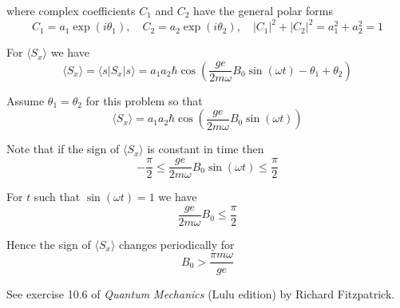 where complex coefficients $C_1$ and $C_2$ have the general polar forms
\begin{equation*}
C_1=a_1\exp(i\theta_1),\quad C_2=a_2\exp(i\theta_2),\quad|C_1|^2+|C_2|^2=a_1^2+a_2^2=1
\end{equation*}

For $\langle S_x\rangle$ we have
\begin{equation*}
\langle S_x\rangle=\langle s|S_x|s\rangle
=a_1a_2\hbar\cos\left(\frac{ge}{2m\omega}B_0\sin(\omega t)-\theta_1+\theta_2\right)
\tag{2}
\end{equation*}

Assume $\theta_1=\theta_2$ for this problem so that
\begin{equation*}
\langle S_x\rangle=a_1a_2\hbar\cos\left(\frac{ge}{2m\omega}B_0\sin(\omega t)\right)
\end{equation*}

Note that if the sign of $\langle S_x\rangle$ is constant in time then
\begin{equation*}
-\frac{\pi}{2}\le\frac{ge}{2m\omega}B_0\sin(\omega t)\le\frac{\pi}{2}
\end{equation*}

For $t$ such that $\sin(\omega t)=1$ we have
\begin{equation*}
\frac{ge}{2m\omega}B_0\le\frac{\pi}{2}
\end{equation*}

Hence the sign of $\langle S_x\rangle$ changes periodically for
\begin{equation*}
B_0>\frac{\pi m\omega}{ge}
\end{equation*}

See exercise 10.6 of {\it Quantum Mechanics}
(Lulu edition) by Richard Fitzpatrick.


